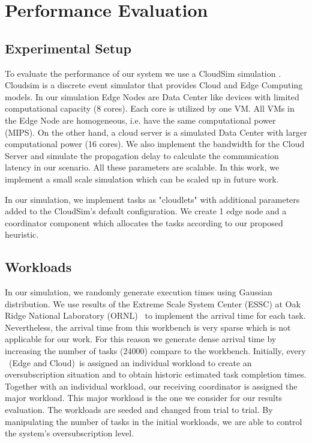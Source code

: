 \section{Performance Evaluation}\label{experiments}
\subsection{Experimental Setup}
To evaluate the performance of our system we use a CloudSim simulation \cite{pe_2}. Cloudsim is a discrete event simulator that provides Cloud and Edge Computing models. In our simulation Edge Nodes are Data Center like devices with limited computational capacity (8 cores). Each core is utilized by one VM. All VMs in the Edge Node are homogeneous, i.e. have the same computational power (MIPS). On the other hand, a cloud server is a simulated Data Center with larger computational power (16 cores). We also implement the bandwidth for the Cloud Server and simulate the propagation delay to calculate the communication latency in our scenario. All these parameters are scalable. In this work, we implement a small scale simulation which can be scaled up in future work. 

In our simulation, we implement tasks as "cloudlets" with additional parameters added to the CloudSim's default configuration. We create 1 edge node and a coordinator component which allocates the tasks according to our proposed heuristic. 

\subsection{\textbf{Workloads}}
In our simulation, we randomly generate execution times using Gaussian distribution\cite{li2017resource}. We use results of the Extreme Scale System Center (ESSC) at Oak Ridge National Laboratory (ORNL)~\cite{khemka2015utility,KHEMKA201514} to implement the arrival time for each task. Nevertheless, the arrival time from this workbench is very sparse which is not applicable for our work. For this reason we generate dense arrival time by increasing the number of tasks (24000) compare to the workbench. Initially, every \pu~(Edge and Cloud)~is assigned an individual workload to create an oversubscription situation and to obtain historic estimated task completion times. Together with an individual workload, our receiving coordinator is assigned the major workload. This major workload is the one we consider for our results evaluation. The workloads are seeded and changed from trial to trial. By manipulating the number of tasks in the initial workloads, we are able to control the system's oversubscription level.

